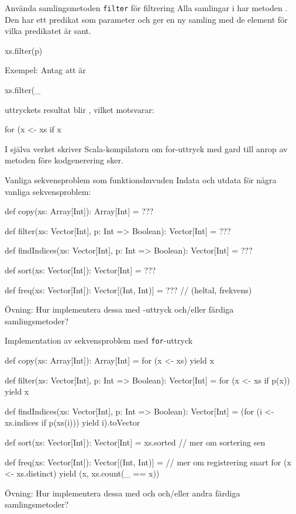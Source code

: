 \begin{Slide}{Använda samlingsmetoden \texttt{filter} för filtrering}
Alla samlingar i  har metoden . Den har ett predikat som parameter  och ger en ny samling med de element för vilka predikatet är sant.
\begin{Code}[basicstyle=\ttfamily\SlideFontSize{12}{14}]
xs.filter(p)
\end{Code}
\pause
Exempel: Antag att  är 
\begin{REPLnonum}
xs.filter(_ %
\end{REPLnonum}
\pause
uttryckets resultat blir , vilket motsvarar:
\begin{Code}[basicstyle=\ttfamily\SlideFontSize{10}{13}]
for (x <- xs if x %
\end{Code}
\pause
I själva verket skriver Scala-kompilatorn om for-uttryck med gard till anrop av metoden  före kodgenerering sker.
\end{Slide}


\begin{Slide}{Vanliga sekvensproblem som funktionshuvuden}
Indata och utdata för några vanliga sekvensproblem:
\begin{Code}
def copy(xs: Array[Int]): Array[Int] = ???

def filter(xs: Vector[Int], p: Int => Boolean): Vector[Int] = ???

def findIndices(xs: Vector[Int], p: Int => Boolean): Vector[Int] = ???

def sort(xs: Vector[Int]): Vector[Int] = ???

def freq(xs: Vector[Int]): Vector[(Int, Int)] = ???  // (heltal, frekvens)
\end{Code}
Övning: Hur implementera dessa med -uttryck och/eller färdiga samlingsmetoder?
\end{Slide}


\begin{Slide}{Implementation av sekvensproblem med \texttt{for}-uttryck}
\begin{Code}
def copy(xs: Array[Int]): Array[Int] = for (x <- xs) yield x

def filter(xs: Vector[Int], p: Int => Boolean): Vector[Int] =
  for (x <- xs if p(x)) yield x

def findIndices(xs: Vector[Int], p: Int => Boolean): Vector[Int] =
  (for (i <- xs.indices if p(xs(i))) yield i).toVector

def sort(xs: Vector[Int]): Vector[Int] = xs.sorted // mer om sortering sen

def freq(xs: Vector[Int]): Vector[(Int, Int)] = // mer om registrering snart
  for (x <- xs.distinct) yield (x, xs.count(_ == x))
\end{Code}
Övning: Hur implementera dessa med  och  och/eller andra färdiga samlingsmetoder?
\end{Slide}

